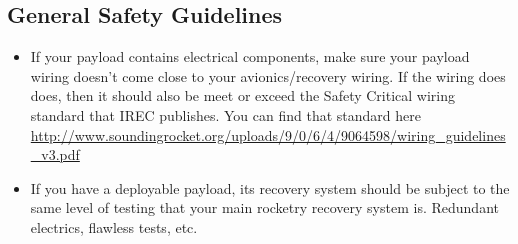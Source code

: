 \subsection{General Safety Guidelines}
\begin{itemize}
\item If your payload contains electrical components, make sure your payload wiring doesn't come close to your avionics/recovery wiring. If the wiring does does, then it should also be meet or exceed the Safety Critical wiring standard that IREC publishes. You can find that standard here \url{http://www.soundingrocket.org/uploads/9/0/6/4/9064598/wiring_guidelines_v3.pdf}
\item If you have a deployable payload, its recovery system should be subject to the same level of testing that your main rocketry recovery system is. Redundant electrics, flawless tests, etc. 
\end{itemize}
